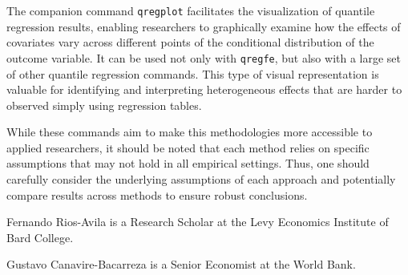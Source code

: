 \documentclass[bib]{statapress}
\begin{document}
The companion command \texttt{qregplot} facilitates the visualization of
quantile regression results, enabling researchers to graphically examine
how the effects of covariates vary across different points of the
conditional distribution of the outcome variable. It can be used not
only with \texttt{qregfe}, but also with a large set of other quantile
regression commands. This type of visual representation is valuable for
identifying and interpreting heterogeneous effects that are harder to
observed simply using regression tables.

While these commands aim to make this methodologies more accessible to
applied researchers, it should be noted that each method relies on
specific assumptions that may not hold in all empirical settings. Thus,
one should carefully consider the underlying assumptions of each
approach and potentially compare results across methods to ensure robust
conclusions.

\clearpage





\begin{aboutauthors}

Fernando Rios-Avila is a Research Scholar at the Levy Economics
Institute of Bard College.

Gustavo Canavire-Bacarreza is a Senior Economist at the World Bank.

\end{aboutauthors}
\end{document}
